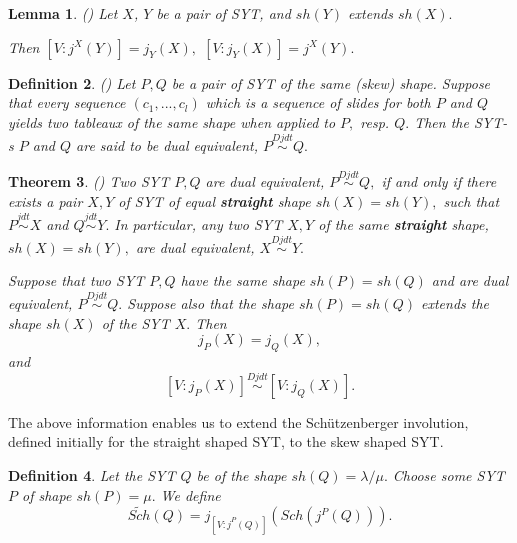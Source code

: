 \documentclass[12pt]{article}%
\newtheorem{theorem}{Theorem}
\newtheorem{definition}[theorem]{Definition}
\newtheorem{lemma}[theorem]{Lemma}
\begin{document}
\begin{lemma}
(\cite{H}) Let $X$, $Y$ be a pair of SYT, and $sh\left(  Y\right)  $ extends
$sh\left(  X\right)  .$

Then $\left[  V:j^{X}\left(  Y\right)  \right]  =j_{Y}\left(  X\right)  ,$
$\left[  V:j_{Y}\left(  X\right)  \right]  =j^{X}\left(  Y\right)  .$
\end{lemma}

\begin{definition}
(\cite{H}) Let $P,Q$ be a pair of SYT of the same (skew) shape. Suppose that
every sequence $\left(  c_{1},...,c_{l}\right)  $ which is a sequence of
slides for both $P$ and $Q$ yields two tableaux of the same shape when applied
to $P,$ resp. $Q.$ Then the SYT-s $P$ and $Q$ are said to be \textit{dual
equivalent, }$P\overset{Djdt}{\sim}Q.$
\end{definition}

\begin{theorem}
(\cite{H}) Two SYT $P,Q$ are dual equivalent, $P\overset{Djdt}{\sim}Q,$ if and
only if there exists a pair $X,Y$ of SYT of equal \textbf{straight} shape
$sh\left(  X\right)  =sh\left(  Y\right)  ,$ such that $P\overset{jdt}{\sim}X$
and $Q\overset{jdt}{\sim}Y.$ In particular, any two SYT $X,Y$ of the same
\textbf{straight} shape, $sh\left(  X\right)  =sh\left(  Y\right)  ,$ are dual
equivalent, $X\overset{Djdt}{\sim}Y.$

Suppose that two SYT $P,Q$ have the same shape $sh\left(  P\right)  =sh\left(
Q\right)  $ and are dual equivalent, $P\overset{Djdt}{\sim}Q.$ Suppose also
that the shape $sh\left(  P\right)  =sh\left(  Q\right)  $ extends the shape
$sh\left(  X\right)  $ of the SYT $X.$ Then%
\begin{equation}
j_{P}\left(  X\right)  =j_{Q}\left(  X\right)  , \label{52}%
\end{equation}
and
\begin{equation}
\left[  V:j_{P}\left(  X\right)  \right]  \overset{Djdt}{\sim}\left[
V:j_{Q}\left(  X\right)  \right]  . \label{51}%
\end{equation}

\end{theorem}

The above information enables us to extend the Sch\"{u}tzenberger involution,
defined initially for the straight shaped SYT, to the skew shaped SYT.

\begin{definition}
Let the SYT $Q$ be of the shape $sh\left(  Q\right)  =\lambda/\mu.$ Choose
some SYT $P$ of shape $sh\left(  P\right)  =\mu.$ We define%
\begin{equation}
\widetilde{Sch}\left(  Q\right)  =j_{\left[  V:j^{P}\left(  Q\right)  \right]
}\left(  Sch\left(  j^{P}\left(  Q\right)  \right)  \right)  . \label{54}%
\end{equation}

\end{definition}
\end{document}
